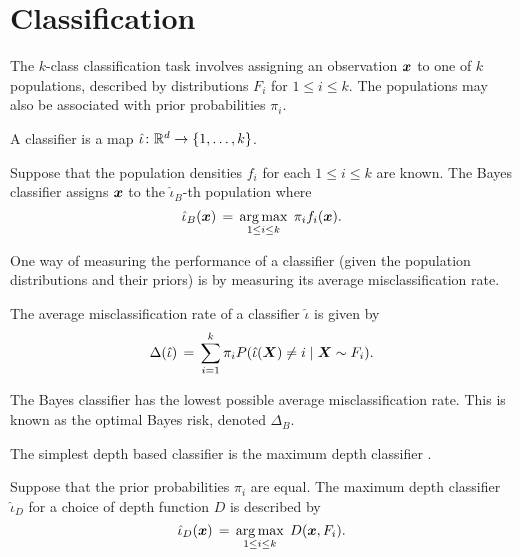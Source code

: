 \section{Classification}

The $k$-class classification task involves assigning an observation $\bm{x}$ to
one of $k$ populations, described by distributions $F_i$ for $1 \leq i \leq
k$.
The populations may also be associated with prior probabilities $\pi_i$.

\begin{definition}[Classifier]
    A classifier is a map $\hat{\iota}\colon \mathbb{R}^d \to \{1, \dots, k\}$.
\end{definition}

\begin{example}
    Suppose that the population densities $f_i$ for each $1 \leq i \leq k$ are
    known.
    The Bayes classifier assigns $\bm{x}$ to the $\hat{\iota}_B$-th population
    where
    \begin{equation}
        \hat{\iota}_B(\bm{x}) \,=\, \operatorname*{arg\,max}_{1 \leq i \leq k}\; \pi_i f_i(\bm{x}).
    \end{equation}
\end{example}

One way of measuring the performance of a classifier (given the population
distributions and their priors) is by measuring its average misclassification
rate.

\begin{definition}
    The average misclassification rate of a classifier $\hat{\iota}$ is given
    by
    \begin{equation}
        \Delta(\hat{\iota}) \,=\, \sum_{i = 1}^k \pi_i P(\hat{\iota}(\bm{X}) \neq i \mid \bm{X} \sim F_i).
    \end{equation}
\end{definition}

\begin{proposition}
    The Bayes classifier has the lowest possible average misclassification
    rate. This is known as the optimal Bayes risk, denoted $\Delta_B$.
\end{proposition}

The simplest depth based classifier is the maximum depth classifier
\parencite{ghosh-chaudhuri-2005}.

\begin{example}
    Suppose that the prior probabilities $\pi_i$ are equal.
    The maximum depth classifier $\hat{\iota}_D$ for a choice of depth
    function $D$ is described by
    \begin{equation}
        \hat{\iota}_D(\bm{x}) \,=\, \operatorname*{arg\,max}_{1 \leq i \leq k}\; D(\bm{x}, F_i).
    \end{equation}
\end{example}

